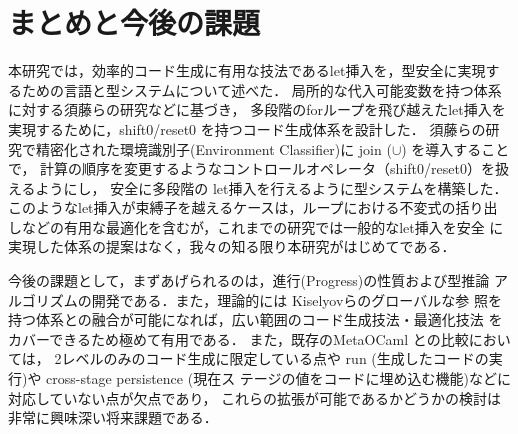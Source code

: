 \chapter{まとめと今後の課題}
本研究では，効率的コード生成に有用な技法であるlet挿入を，型安全に実現す
るための言語と型システムについて述べた．
局所的な代入可能変数を持つ体系に対する須藤らの研究\cite{Sudo2014}などに基づき，
多段階のforループを飛び越えたlet挿入を実現するために，shift0/reset0 を持つコード生成体系を設計した．
須藤らの研究で精密化された環境識別子(Environment Classifier)に join ($\cup$) を導入することで，
計算の順序を変更するようなコントロールオペレータ（shift0/reset0）を扱えるようにし，
安全に多段階の let挿入を行えるように型システムを構築した．
このようなlet挿入が束縛子を越えるケースは，ループにおける不変式の括り出
しなどの有用な最適化を含むが，これまでの研究では一般的なlet挿入を安全
に実現した体系の提案はなく，我々の知る限り本研究がはじめてである．

今後の課題として，まずあげられるのは，進行(Progress)の性質および型推論
アルゴリズムの開発である．また，理論的には Kiselyovらのグローバルな参
照を持つ体系との融合が可能になれば，広い範囲のコード生成技法・最適化技法
をカバーできるため極めて有用である．
また，既存のMetaOCaml との比較においては，
2レベルのみのコード生成に限定している点や
run (生成したコードの実行)や cross-stage persistence (現在ス
テージの値をコードに埋め込む機能)などに対応していない点が欠点であり，
これらの拡張が可能であるかどうかの検討は非常に興味深い将来課題である．

